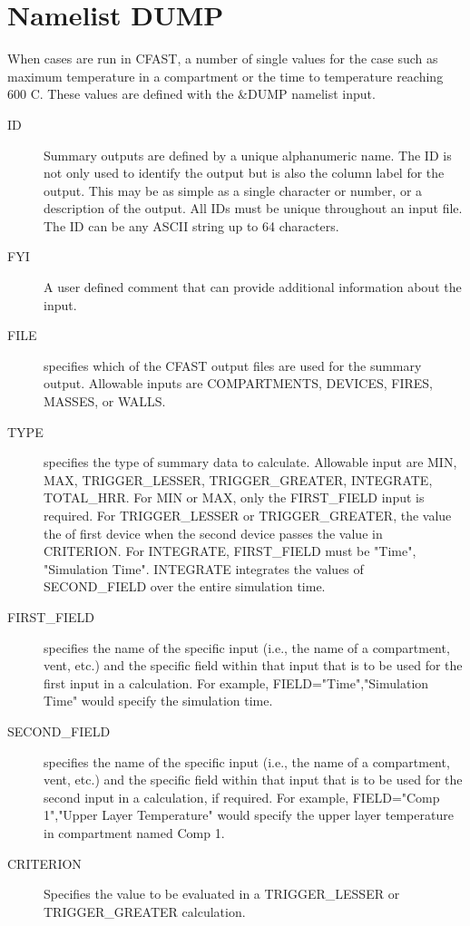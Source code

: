 \documentclass[12pt,twoside]{book}
\begin{document}
\section{Namelist DUMP}

When cases are run in CFAST, a number of single values for the case such as maximum temperature in a compartment or the time to temperature reaching 600 C. These values are defined with the {\ct \&DUMP} namelist input.

\begin{description}
  \item[ID] Summary outputs are defined by a unique alphanumeric name. The ID is not only used to identify the output but is also the column label for the output. This may be as simple as a single character or number, or a description of the output. All IDs must be unique throughout an input file.  The { \ct ID} can be any ASCII string up to 64 characters.
  \item[FYI] A user defined comment that can provide additional information about the input.
  \item[FILE] specifies which of the CFAST output files are used for the summary output. Allowable inputs are {\ct COMPARTMENTS}, {\ct DEVICES}, {\ct FIRES}, {\ct MASSES}, or {\ct WALLS}.
  \item[TYPE] specifies the type of summary data to calculate. Allowable input are {\ct MIN}, {\ct MAX}, {\ct TRIGGER\_LESSER}, {\ct TRIGGER\_GREATER}, {\ct INTEGRATE}, {\ct TOTAL\_HRR}. For {\ct MIN} or {\ct MAX}, only the {\ct FIRST\_FIELD} input is required. For {\ct TRIGGER\_LESSER} or {\ct TRIGGER\_GREATER}, the value the of first device when the second device passes the value in {\ct CRITERION}. For {\ct INTEGRATE}, {\ct FIRST\_FIELD} must be {\ct "Time", "Simulation Time"}. {\ct INTEGRATE} integrates the values of {\ct SECOND\_FIELD} over the entire simulation time.
  \item[FIRST\_FIELD] specifies the name of the specific input (i.e., the name of a compartment, vent, etc.) and the specific field within that input that is to be used for the first input in a calculation. For example, {\ct FIELD="Time","Simulation Time"} would specify the simulation time.
  \item[SECOND\_FIELD] specifies the name of the specific input (i.e., the name of a compartment, vent, etc.) and the specific field within that input that is to be used for the second input in a calculation, if required. For example, {\ct FIELD="Comp 1","Upper Layer Temperature"} would specify the upper layer temperature in compartment named {\ct Comp 1}.
  \item[CRITERION] Specifies the value to be evaluated in a {\ct TRIGGER\_LESSER} or {\ct TRIGGER\_GREATER} calculation.
\end{description}
\end{document}
